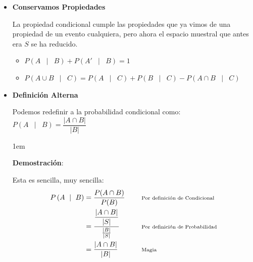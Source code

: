\documentclass[12pt, fleqn]{report}                             %
\newenvironment{SmallIndentation}[1][0.75em]                    %
        {\begin{adjustwidth}{#1}{}\begin{footnotesize}}             %
        {\end{footnotesize}\end{adjustwidth}}                       %
\DeclareMathOperator \Space {\quad}                             %
\DeclareMathOperator \MiniSpace {\;}                            %
\newcommand \Such {\MiniSpace | \MiniSpace}                     %
\newcommand \Remember[1]{\Space\text{\scriptsize{#1}}}          %
\theoremstyle{break}                                            %
\newcommand{\Wrap}[1]{\left( #1 \right)}                        %
\newcommand{\Mag}[1]{\left| #1 \right|}                         %
\begin{document}
                \begin{itemize}

                    \item
                        \textbf{Conservamos Propiedades}

                        La propiedad condicional cumple las propiedades que ya vimos de una propiedad
                        de un evento cualquiera, pero ahora el espacio muestral que antes era $S$ se
                        ha reducido.

                        \begin{itemize}
                            \item $P\Wrap{ A \Such B} + P\Wrap{ A' \Such B} = 1$
                            \item $P\Wrap{ A \cup B \Such C} 
                                        = P\Wrap{A \Such C} + P\Wrap{B \Such C}
                                        - P\Wrap{A \cap B \Such C}$
                        \end{itemize}


                    \item
                        \textbf{Definición Alterna}

                        Podemos redefinir a la probabilidad condicional como: 
                        $P \Wrap{ A \Such B} = \dfrac{\Mag{A \cap B}}{\Mag{B}}$

                        \begin{SmallIndentation}[1em]
                            \textbf{Demostración}:
                            
                            Esta es sencilla, muy sencilla:
                            \begin{align*}
                                P \Wrap{ A \Such B}
                                    &= \dfrac{P(A \cap B)}{P(B)}
                                        && \Remember{Por definición de Condicional}                 \\
                                    &= \frac{\dfrac{|A \cap B|}{|S|}}{\frac{|B|}{|S|}}
                                        && \Remember{Por definición de Probabilidad}                \\
                                    &= \dfrac{\Mag{A \cap B}}{\Mag{B}}
                                        && \Remember{Magia}
                            \end{align*}
                        

\end{SmallIndentation}
\end{itemize}
\end{document}
